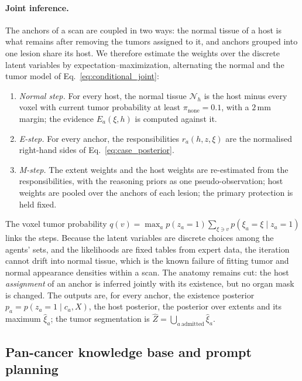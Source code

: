 \documentclass[fleqn,10pt]{olplainarticle}
\begin{document}
\paragraph{Joint inference.}
The anchors of a scan are coupled in two ways: the normal tissue of a host is what remains after removing the tumors
assigned to it, and anchors grouped into one lesion share its host. We therefore estimate the weights over the discrete
latent variables by expectation--maximization, alternating the normal and the tumor model of
Eq.~\eqref{eq:conditional_joint}:
\begin{enumerate}
\item \emph{Normal step.} For every host, the normal tissue $\mathcal{N}_h$ is the host minus every voxel with current tumor
probability at least $\pi_{\mathrm{none}}=0.1$, with a $2$\,mm margin; the evidence $E_a(\xi,h)$ is computed against it.
\item \emph{E-step.} For every anchor, the responsibilities $r_a(h,z,\xi)$ are the normalised right-hand sides of
Eq.~\eqref{eq:case_posterior}.
\item \emph{M-step.} The extent weights and the host weights are re-estimated from the responsibilities, with the
reasoning priors as one pseudo-observation; host weights are pooled over the anchors of each lesion; the primary
protection is held fixed.
\end{enumerate}
The voxel tumor probability $q(v)=\max_a p(z_a=1)\sum_{\xi\ni v}p(\xi_a=\xi\mid z_a=1)$ links the steps.
Because the latent variables are discrete choices among the agents' sets, and the likelihoods are fixed tables from
expert data, the iteration cannot drift into normal tissue, which is the known failure of fitting tumor and normal
appearance densities within a scan. The anatomy remains cut: the host \emph{assignment} of an anchor is inferred jointly
with its existence, but no organ mask is changed. The outputs are, for every anchor, the existence posterior
$p_a=p(z_a=1\mid c_a,X)$, the host posterior, the posterior over extents and its maximum $\hat\xi_a$; the tumor segmentation
is $\hat Z=\bigcup_{a\ \text{admitted}}\hat\xi_a$.

\subsection{Pan-cancer knowledge base and prompt planning}
\label{sec:kb_planning}
\end{document}

